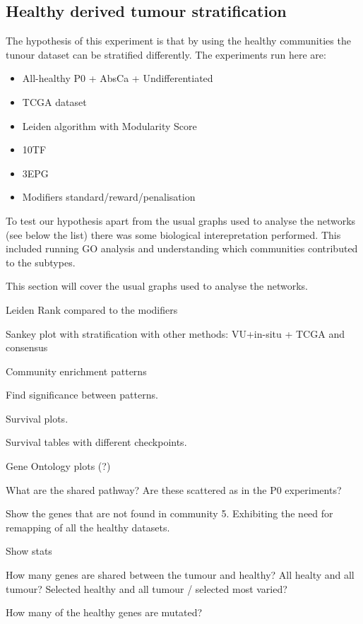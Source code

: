 \subsection{Healthy derived tumour stratification} \label{Sec:N_I:h_derived}

The hypothesis of this experiment is that by using the healthy communities the tunour dataset can be stratified differently. The experiments run here are:
\begin{itemize}
    \item All-healthy \- P0 + AbsCa + Undifferentiated
    \item TCGA dataset
    \item Leiden algorithm with Modularity Score
    \item 10TF
    \item 3EPG
    \item Modifiers standard/reward/penalisation
\end{itemize}

To test our hypothesis apart from the usual graphs used to analyse the networks (see below the list) there was some biological interepretation performed. This included running GO analysis and understanding which communities contributed to the subtypes.

This section will cover the usual graphs used to analyse the networks.
\begin{todolist}
    \item[\done] Leiden Rank compared to the modifiers
    \item[\done] Sankey plot with stratification with other methods: VU+in-situ + TCGA and consensus
    \item[\done] Community enrichment patterns
    \item Find significance between patterns.
    \item [\done] Survival plots.
    \item Survival tables with different checkpoints.
    \item Gene Ontology plots (?)
    \item What are the shared pathway? Are these scattered as in the P0 experiments?
    \item Show the genes that are not found in community 5. Exhibiting the need for remapping of all the healthy datasets.
    \item Show stats
    \begin{todolist}
        \item How many genes are shared between the tumour and healthy? All healty and all tumour? Selected healthy and all tumour / selected most varied?
        \item How many of the healthy genes are mutated?
    \end{todolist}
\end{todolist}

